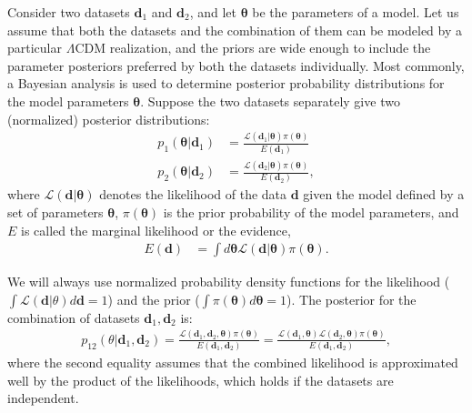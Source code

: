 \documentclass[amsmath, prl, reprint, aps]{revtex4-1}
\newcommand{\dv}{\textbf{d}}
\newcommand{\tv}{\bm{\theta}}
\begin{document}
    Consider two datasets $\dv_1$ and $\dv_2$, and let $\tv$ be the  parameters of a model. Let us assume that both the datasets and the combination of them can be modeled by a particular $\Lambda$CDM realization, and the priors are wide enough to include the parameter posteriors preferred by both the datasets individually. Most commonly, a Bayesian analysis is used to determine posterior probability distributions for the model parameters $\tv$. Suppose the two datasets separately give two (normalized) posterior distributions:
    \begin{equation}
    \begin{aligned}
    p_1(\tv | \dv_1) &= \frac{ \mathcal{L}(\dv_1|\tv) \pi(\tv)}{E(\dv_1)} \\
    p_2(\tv | \dv_2) &= \frac{\mathcal{L}(\dv_2|\tv) \pi(\tv)}{E(\dv_2)},
    \label{eq:p1p2}
    \end{aligned}
    \end{equation}
    where $\mathcal{L}(\dv|\tv)$ denotes the likelihood of the data $\dv$ given the model defined by a set of parameters $\tv$, $\pi(\tv)$ is the prior probability of the model parameters, and $E$ is called the marginal likelihood or the evidence,
    \begin{align}
        E(\dv) &= \int d\tv \mathcal{L}(\dv|\tv) \pi(\tv).
        \label{eq:evidence}
    \end{align}
    
    We will always use normalized probability density functions for the likelihood ($\int \mathcal{L}(\dv|\theta) d\dv = 1$) and the prior  ($\int \pi(\tv) d \tv =1$). The posterior for the combination of datasets $\dv_1, \dv_2$ is:
    \begin{equation}
    \begin{aligned}
    \!\!\!
    p_{12}(\theta|\dv_1,\dv_2) = \frac{\mathcal{L}(\dv_1, \dv_2, \tv) \pi(\tv)}{E(\dv_1, \dv_2)}   = \frac{\mathcal{L}(\dv_1, \tv) \mathcal{L}(\dv_2, \tv) \pi(\tv)}{E(\dv_1, \dv_2)},
    \end{aligned}
    \end{equation}
    where the second equality assumes that the combined likelihood is approximated well by the product of the likelihoods, which holds if the datasets are independent.
    
\end{document}
